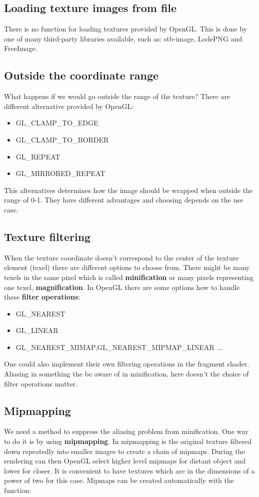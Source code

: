 	 \subsection*{Loading texture images from file}
	 There is no function for loading textures provided by OpenGL. This is done by one of many third-party libraries available, such as: stb-image, LodePNG and FreeImage. 

	 \subsection*{Outside the coordinate range}
	 What happens if we would go outside the range of the texture? There are different alternative provided by OpenGL:

	 \begin{itemize}
	 	\item GL\_CLAMP\_TO\_EDGE
	 	\item GL\_CLAMP\_TO\_BORDER
	 	\item GL\_REPEAT
	 	\item GL\_MIRRORED\_REPEAT
	 \end{itemize}

	 This alternatives determines how the image should be wrapped when outside the range of 0-1. They have different advantages and choosing depends on the use case.


	 \subsection*{Texture filtering}
	 When the texture coordinate doesn't correspond to the center of the texture element (texel) there are different options to choose from. There might be many texels in the same pixel which is called \textbf{minification} or many pixels representing one texel, \textbf{magnification}. In OpenGL there are some options how to handle these \textbf{filter operations}:
	 \begin{itemize}
	 	\item GL\_NEAREST
	 	\item GL\_LINEAR
	 	\item GL\_NEAREST\_MIMAP,GL\_NEAREST\_MIPMAP\_LINEAR ...
	 \end{itemize}

	 One could also implement their own filtering operations in the fragment shader. Aliasing in something the be aware of in minification, here doesn't the choice of filter operations matter.

	 \subsection*{Mipmapping}
	 We need a method to suppress the aliasing problem from minification. One way to do it is by using \textbf{mipmapping}. In mipmapping is the original texture filtered down repeatedly into smaller images to create a chain of mipmaps. During the rendering can then OpenGL select higher level mipmaps for distant object and lower for closer. It is convenient to have textures which are in the dimensions of a power of two for this case. 
	 Mipmaps can be created automatically with the function:

